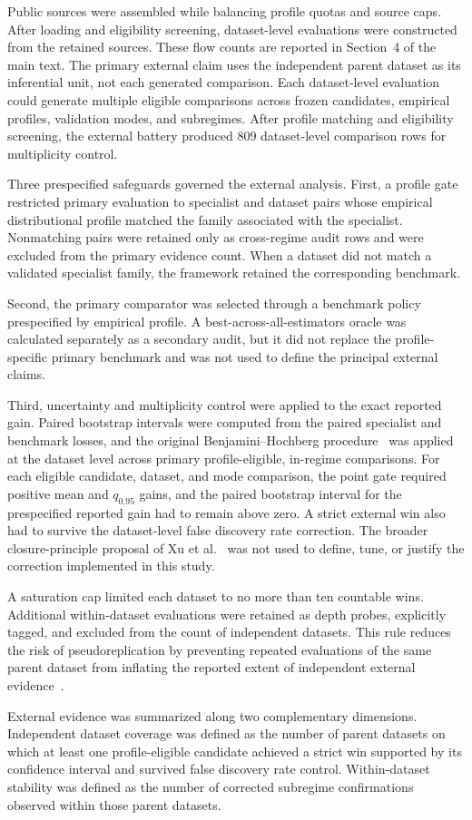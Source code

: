 Public sources were assembled while balancing profile quotas and source caps. After loading and eligibility screening, dataset-level evaluations were constructed from the retained sources. These flow counts are reported in Section~4 of the main text. The primary external claim uses the independent parent dataset as its inferential unit, not each generated comparison. Each dataset-level evaluation could generate multiple eligible comparisons across frozen candidates, empirical profiles, validation modes, and subregimes. After profile matching and eligibility screening, the external battery produced 809 dataset-level comparison rows for multiplicity control.

Three prespecified safeguards governed the external analysis. First, a profile gate restricted primary evaluation to specialist and dataset pairs whose empirical distributional profile matched the family associated with the specialist. Nonmatching pairs were retained only as cross-regime audit rows and were excluded from the primary evidence count. When a dataset did not match a validated specialist family, the framework retained the corresponding benchmark.

Second, the primary comparator was selected through a benchmark policy prespecified by empirical profile. A best-across-all-estimators oracle was calculated separately as a secondary audit, but it did not replace the profile-specific primary benchmark and was not used to define the principal external claims.

Third, uncertainty and multiplicity control were applied to the exact reported gain. Paired bootstrap intervals were computed from the paired specialist and benchmark losses, and the original Benjamini--Hochberg procedure~\citep{benjamini1995controlling} was applied at the dataset level across primary profile-eligible, in-regime comparisons. For each eligible candidate, dataset, and mode comparison, the point gate required positive mean and $q_{0.95}$ gains, and the paired bootstrap interval for the prespecified reported gain had to remain above zero. A strict external win also had to survive the dataset-level false discovery rate correction. The broader closure-principle proposal of Xu et al.~\citep{xu2025closure} was not used to define, tune, or justify the correction implemented in this study.

A saturation cap limited each dataset to no more than ten countable wins. Additional within-dataset evaluations were retained as depth probes, explicitly tagged, and excluded from the count of independent datasets. This rule reduces the risk of pseudoreplication by preventing repeated evaluations of the same parent dataset from inflating the reported extent of independent external evidence~\citep{hurlbert1984pseudoreplication,aarts2014solution}.

External evidence was summarized along two complementary dimensions.
Independent dataset coverage was defined as the number of parent datasets on which at least one profile-eligible candidate achieved a strict win supported by its confidence interval and survived false discovery rate control. Within-dataset stability was defined as the number of corrected subregime confirmations observed within those parent datasets.
